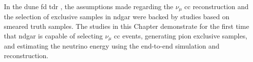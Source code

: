 In the \gls{dune} \gls{fd} \gls{tdr} \cite{DUNE2020TDR2}, the assumptions made regarding the $\nu_{\mu}$ \gls{cc} reconstruction and the selection of exclusive samples in \gls{ndgar} were backed by studies based on smeared truth samples. The studies in this Chapter demonstrate for the first time that \gls{ndgar} is capable of selecting $\nu_{\mu}$ \gls{cc} events, generating pion exclusive samples, and estimating the neutrino energy using the end-to-end simulation and reconstruction.